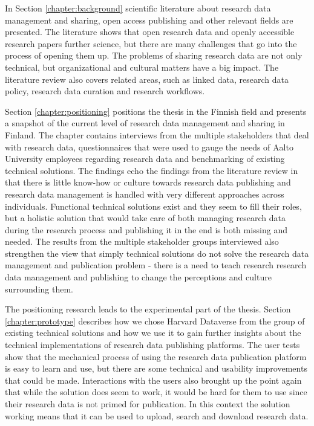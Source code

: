 In Section \ref{chapter:background} scientific literature about research data
management and sharing, open access publishing and other relevant fields are
presented. The literature shows that open research data and openly accessible
research papers further science, but there are many challenges that go into
the process of opening them up. The problems of sharing research data are not
only technical, but organizational and cultural matters have a big impact. The
literature review also covers related areas, such as linked data, research
data policy, research data curation and research workflows.

Section \ref{chapter:positioning} positions the thesis in the Finnish field and
presents a snapshot of the current level of research data management and
sharing in Finland. The chapter contains interviews from the multiple
stakeholders that deal with research data, questionnaires that were used to
gauge the needs of Aalto University employees regarding research data and
benchmarking of existing technical solutions. The findings echo the findings from the
literature review in that there is little know-how or culture towards research
data publishing and research data management is handled with very different
approaches across individuals. Functional technical solutions exist and they
seem to fill their roles, but a holistic solution that would take care of both
managing research data during the research process and publishing it in the end
is both missing and needed. The results from the multiple stakeholder groups
interviewed also strengthen the view that simply technical solutions do not
solve the research data management and publication problem - there is a need to
teach research research data management and publishing to change the perceptions
and culture surrounding them.

The positioning research leads to the experimental part of the thesis. Section
\ref{chapter:prototype} describes how we chose Harvard Dataverse from the
group of existing technical solutions and how we use it to gain further insights about
the technical implementations of research data publishing platforms. The user tests
show that the mechanical process of using the research data publication
platform is easy to learn and use, but there are some technical and usability
improvements that could be made. Interactions with the users also brought up
the point again that while the solution does seem to work, it would be hard
for them to use since their research data is not primed for publication. In
this context the solution working means that it can be used to upload, search
and download research data.

